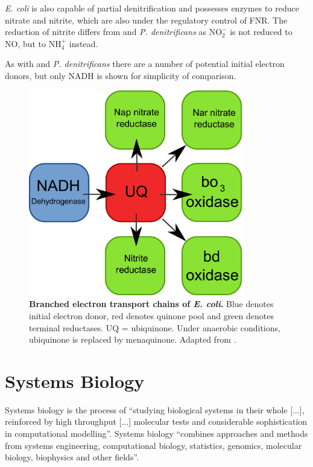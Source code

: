 \textit{E. coli} is also capable of partial denitrification and possesses enzymes to reduce nitrate and nitrite, which are also under the regulatory control of FNR. The reduction of nitrite differs from \Nm{} and \textit{P. denitrificans} as $\mathrm{NO}_2^-$ is not reduced to NO, but to $\mathrm{NH}_4^+$ instead.

As with \Nm{} and \textit{P. denitrificans} there are a number of potential initial electron donors, but only NADH is shown for simplicity of comparison.

\begin{figure}[tbp]
\begin{center}
	\includegraphics[height=9cm]{01-introduction/data/e_coli_resp.pdf}
	\caption[{\bf Branched electron transport chains of \textit{E. coli}.}]{{\bf Branched electron transport chains of \textit{E. coli}.} Blue denotes initial electron donor, red denotes quinone pool and green denotes terminal reductases. UQ = ubiquinone. Under anaerobic conditions, ubiquinone is replaced by menaquinone. Adapted from \citet{Nicholls1992}.
	\label{fig:e_coli_resp}}
\end{center}
\end{figure}


\section{Systems Biology}
Systems biology is the process of ``studying biological systems in their whole [...], reinforced by high throughput [...] molecular tests and considerable sophistication in computational modelling''\cite{Kahlem2006}. Systems biology ``combines approaches and methods from systems engineering, computational biology, statistics, genomics, molecular biology, biophysics and other fields''\cite{Doyle2006}.


